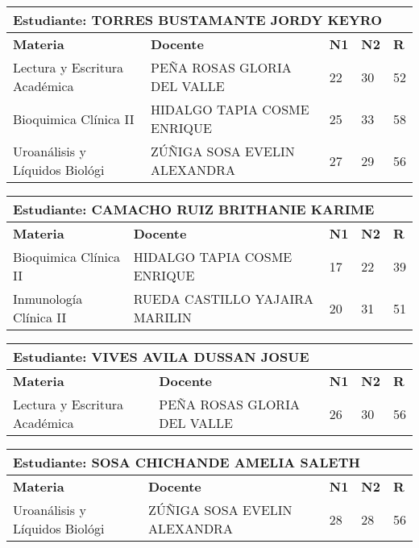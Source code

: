 \small
\begin{tabularx}{\textwidth}{|p{5cm}|p{7cm}|X|X|X|}
\hline
\multicolumn{5}{|p{\dimexpr\textwidth-2\tabcolsep-2\arrayrulewidth}|}{\textbf{Estudiante: TORRES BUSTAMANTE JORDY KEYRO }}\\\hline
\textbf{Materia} & \textbf{Docente} & \textbf{N1} & \textbf{N2} & \textbf{R} \\ \hline
Lectura y Escritura Académica & PEÑA ROSAS GLORIA DEL VALLE  & 22 & 30& 52 \\ \hline
Bioquimica Clínica II & HIDALGO TAPIA COSME ENRIQUE  & 25 & 33& 58 \\ \hline
Uroanálisis y Líquidos Biológi & ZÚÑIGA SOSA EVELIN ALEXANDRA  & 27 & 29& 56 \\ \hline
\end{tabularx}\vspace{10mm}
\small
\begin{tabularx}{\textwidth}{|p{5cm}|p{7cm}|X|X|X|}
\hline
\multicolumn{5}{|p{\dimexpr\textwidth-2\tabcolsep-2\arrayrulewidth}|}{\textbf{Estudiante: CAMACHO RUIZ BRITHANIE KARIME }}\\\hline
\textbf{Materia} & \textbf{Docente} & \textbf{N1} & \textbf{N2} & \textbf{R} \\ \hline
Bioquimica Clínica II & HIDALGO TAPIA COSME ENRIQUE  & 17 & 22& 39 \\ \hline
Inmunología Clínica II & RUEDA CASTILLO YAJAIRA MARILIN  & 20 & 31& 51 \\ \hline
\end{tabularx}\vspace{10mm}
\small
\begin{tabularx}{\textwidth}{|p{5cm}|p{7cm}|X|X|X|}
\hline
\multicolumn{5}{|p{\dimexpr\textwidth-2\tabcolsep-2\arrayrulewidth}|}{\textbf{Estudiante: VIVES AVILA DUSSAN JOSUE }}\\\hline
\textbf{Materia} & \textbf{Docente} & \textbf{N1} & \textbf{N2} & \textbf{R} \\ \hline
Lectura y Escritura Académica & PEÑA ROSAS GLORIA DEL VALLE  & 26 & 30& 56 \\ \hline
\end{tabularx}\vspace{10mm}
\small
\begin{tabularx}{\textwidth}{|p{5cm}|p{7cm}|X|X|X|}
\hline
\multicolumn{5}{|p{\dimexpr\textwidth-2\tabcolsep-2\arrayrulewidth}|}{\textbf{Estudiante: SOSA CHICHANDE AMELIA SALETH }}\\\hline
\textbf{Materia} & \textbf{Docente} & \textbf{N1} & \textbf{N2} & \textbf{R} \\ \hline
Uroanálisis y Líquidos Biológi & ZÚÑIGA SOSA EVELIN ALEXANDRA  & 28 & 28& 56 \\ \hline
\end{tabularx}\vspace{10mm}
